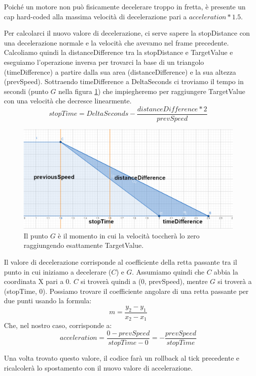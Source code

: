 \documentclass[main.tex]{subfiles}
\begin{document}
Poiché un motore non può fisicamente decelerare troppo in fretta, è presente un cap hard-coded alla massima velocità di decelerazione pari a $acceleration * 1.5$.

Per calcolarci il nuovo valore di decelerazione, ci serve sapere la stopDistance con una decelerazione normale e la velocità che avevamo nel frame precedente. Calcoliamo quindi la distanceDifference tra la stopDistance e TargetValue e eseguiamo l'operazione inversa per trovarci la base di un triangolo (timeDifference) a partire dalla sua area (distanceDifference) e la sua altezza (prevSpeed). Sottraendo timeDifference a DeltaSeconds ci troviamo il tempo in secondi (punto $G$ nella figura \ref{fig:4_OverrideDecelTimeDiff}) che impiegheremo per raggiungere TargetValue con una velocità che decresce linearmente.
\[stopTime = DeltaSeconds - \frac{distanceDifference * 2}{prevSpeed}\]
\begin{figure}[H]
    \centering
    \includegraphics[width=.95\linewidth]{img/interpolazione/OverrideDecelTimeDiff.png}
    \caption{Il punto $G$ è il momento in cui la velocità toccherà lo zero raggiungendo esattamente TargetValue.}
    \label{fig:4_OverrideDecelTimeDiff}
\end{figure}
\clearpage %
\noindent Il valore di decelerazione corrisponde al coefficiente della retta passante tra il punto in cui iniziamo a decelerare ($C$) e $G$. Assumiamo quindi che $C$ abbia la coordinata X pari a 0. $C$ si troverà quindi a (0, prevSpeed), mentre $G$ si troverà a (stopTime, 0). Possiamo trovare il coefficiente angolare di una retta passante per due punti usando la formula:
\[m = \frac{y_2 - y_1}{x_2 - x_1}\]
Che, nel nostro caso, corrisponde a:
\[acceleration = \frac{0 - prevSpeed}{stopTime - 0} = -\frac{prevSpeed}{stopTime}\]

Una volta trovato questo valore, il codice farà un rollback al tick precedente e ricalcolerà lo spostamento  con il nuovo valore di accelerazione.
\end{document}
